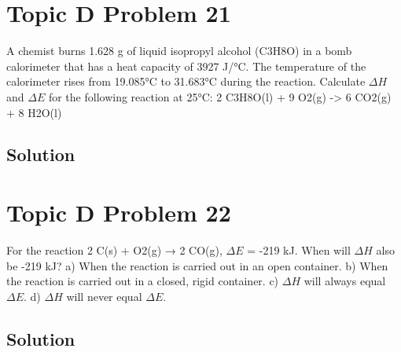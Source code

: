 \documentclass[10pt]{article}
\begin{document}
    \pagebreak
    \section{Topic D Problem 21}
        A chemist burns 1.628 g of liquid isopropyl alcohol (C3H8O) in a bomb calorimeter that has a
heat capacity of 3927 J/\unit{\celsius}. The temperature of the calorimeter rises from 19.085\unit{\celsius} to
31.683\unit{\celsius} during the reaction. Calculate $\Delta H$ and $\Delta E$ for the following reaction at 25\unit{\celsius}:
2 C3H8O(l) + 9 O2(g) -> 6 CO2(g) + 8 H2O(l)
        
        \subsection{Solution}

    \pagebreak
    \section{Topic D Problem 22}
        For the reaction 2 C(s) + O2(g) → 2 CO(g), $\Delta E$ = -219 kJ. When will $\Delta H$ also be -219 kJ?
a) When the reaction is carried out in an open container.
b) When the reaction is carried out in a closed, rigid container.
c) $\Delta H$ will always equal $\Delta E$.
d) $\Delta H$ will never equal $\Delta E$.
        
        \subsection{Solution}
\end{document}
